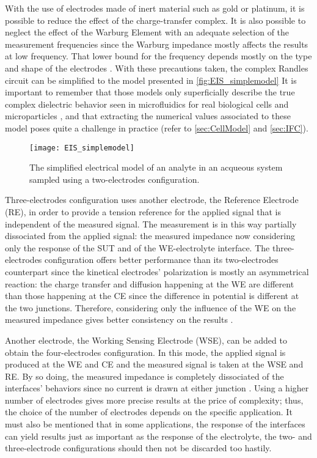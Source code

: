 With the use of electrodes made of inert material such as gold or platinum, it is possible to reduce the effect of the charge-transfer complex. It is also possible to neglect the effect of the Warburg Element with an adequate selection of the measurement frequencies since the Warburg impedance mostly affects the results at low frequency. That lower bound for the frequency depends mostly on the type and shape of the electrodes \cite{Randles1947}. With these precautions taken, the complex Randles circuit can be simplified to the model presented in \autoref{fig:EIS_simplemodel} It is important to remember that those models only superficially describe the true complex dielectric behavior seen in microfluidics for real biological cells and microparticles \cite{Gawad2004}, and that extracting the numerical values associated to these model poses quite a challenge in practice (refer to \autoref{sec:CellModel} and \autoref{sec:IFC}). \par
\begin{figure}[h]
    \centering
    \texttt{[image: EIS\_simplemodel]}
    \caption{The simplified electrical model of an analyte in an acqueous system sampled using a two-electrodes configuration.}
    \label{fig:EIS_simplemodel}
\end{figure}

Three-electrodes configuration uses another electrode, the Reference Electrode (RE), in order to provide a tension reference for the applied signal that is independent of the measured signal. The measurement is in this way partially dissociated from the applied signal: the measured impedance now considering only the response of the SUT and of the WE-electrolyte interface. The three-electrodes configuration offers better performance than its two-electrodes counterpart since the kinetical electrodes’ polarization is mostly an asymmetrical reaction: the charge transfer and diffusion happening at the WE are different than those happening at the CE since the difference in potential is different at the two junctions. Therefore, considering only the influence of the WE on the measured impedance gives better consistency on the results \cite{Grossi2017}. \par

Another electrode, the Working Sensing Electrode (WSE), can be added to obtain the four-electrodes configuration. In this mode, the applied signal is produced at the WE and CE and the measured signal is taken at the WSE and RE. By so doing, the measured impedance is completely dissociated of the interfaces’ behaviors since no current is drawn at either junction \cite{Grossi2017}. Using a higher number of electrodes gives more precise results at the price of complexity; thus, the choice of the number of electrodes depends on the specific application. It must also be mentioned that in some applications, the response of the interfaces can yield results just as important as the response of the electrolyte, the two- and three-electrode configurations should then not be discarded too hastily. \par

